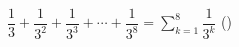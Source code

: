 $\dfrac{1}{3}+\dfrac{1}{3^2}+\dfrac{1}{3^3}+\cdots+\dfrac{1}{3^8}=\displaystyle\sum_{k=1}^{8}\dfrac{1}{3^k}$ \hfill (\hspace*{2.4em})
